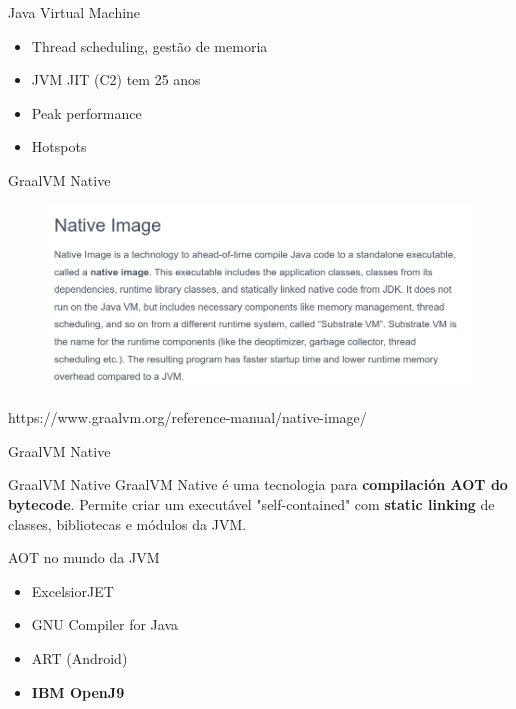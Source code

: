 \documentclass[aspectratio=169]{beamer}
\begin{document}
\begin{frame}{Java Virtual Machine}

	\begin{itemize}
		\item Thread scheduling, gestão de memoria
		\item JVM JIT (C2) tem 25 anos
		\item Peak performance
		\item Hotspots
	\end{itemize}

\end{frame}


\begin{frame}{GraalVM Native}
	\begin{figure}
		\centering
		\includegraphics[width=\linewidth]{Images/nativeimagedefinition.png}
	\end{figure}
{\tiny https://www.graalvm.org/reference-manual/native-image/}
\end{frame}


\begin{frame}{GraalVM Native}

	\begin{exampleblock}{GraalVM Native}
	GraalVM Native é uma tecnologia para \textbf{compilación AOT do bytecode}. Permite criar um executável "self-contained" com \textbf{static linking} de classes, bibliotecas e módulos da JVM.
	\end{exampleblock}

\end{frame}




\begin{frame}{AOT no mundo da JVM}
	\begin{itemize}
		\item ExcelsiorJET
		\item GNU Compiler for Java
		\item ART (Android)
		\item \textbf{IBM OpenJ9}
	\end{itemize}

\end{frame}
\end{document}

